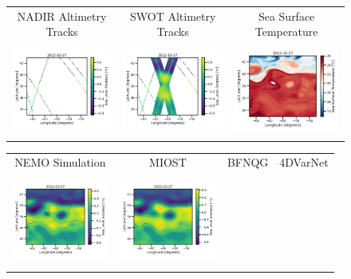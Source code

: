 \begin{figure}[t!]
\small
\begin{center}
\setlength{\tabcolsep}{1pt}
\begin{tabular}{ccc}
NADIR Altimetry Tracks & 
SWOT Altimetry Tracks &
Sea Surface Temperature \\
\includegraphics[width=4.25cm,height=3cm]{content/figures/maps/sla/dc20a_ssh_anomaly_nadir4_2012-10-27.png} 
&
\includegraphics[width=4.25cm,height=3cm]{content/figures/maps/sla/dc20a_ssh_anomaly_swot1nadir5_2012-10-27.png} &
\includegraphics[width=4.25cm,height=3cm]{content/figures/maps/sst/dc20a_nemo_sst.png}
\end{tabular}
\begin{tabular}{cccc}
\hspace{3mm} NEMO Simulation & 
\hspace{3mm} MIOST & 
\hspace{3mm} BFNQG & 
4DVarNet \\
\vspace{-2mm}
\includegraphics[trim={0 0 42mm 0},clip, width=3.20cm,height=3cm]{content/figures/maps/sla/dc20a_nemo_sla.png} &
\includegraphics[trim={0 0 42mm 0},clip, width=3.2cm,height=3cm]{content/figures/maps/sla/dc20a_miost_sla.png} &

\end{tabular}
\end{center}
\end{figure}

